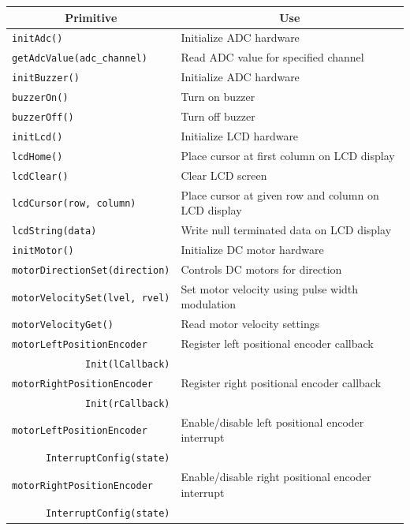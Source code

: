 \documentclass[a4paper, 12pt]{article}
\begin{document}
\begin{table}
 \centering
 \begin{tabular}{|l|l|}
 \hline
 \multicolumn{1}{|c|}{\textbf{Primitive}} & \multicolumn{1}{|c|}{\textbf{Use}}\\
 \hline \hline
 \texttt{initAdc()} & Initialize ADC hardware\\
 \texttt{getAdcValue(adc\_channel)} & Read ADC value for specified channel\\
 \hline
 \texttt{initBuzzer()} & Initialize ADC hardware\\
 \texttt{buzzerOn()} & Turn on buzzer\\
 \texttt{buzzerOff()} & Turn off buzzer\\
 \hline
 \texttt{initLcd()} & Initialize LCD hardware\\
 \texttt{lcdHome()} & Place cursor at first column on LCD display\\
 \texttt{lcdClear()} & Clear LCD screen\\
 \texttt{lcdCursor(row, column)} & Place cursor at given row and column on LCD display\\
 \texttt{lcdString(data)} & Write null terminated data on LCD display\\
 \hline
 \texttt{initMotor()} & Initialize DC motor hardware\\
 \texttt{motorDirectionSet(direction)} & Controls DC motors for direction\\
 \texttt{motorVelocitySet(lvel, rvel)} & Set motor velocity using pulse width modulation\\
 \texttt{motorVelocityGet()} & Read motor velocity settings\\
 \texttt{motorLeftPositionEncoder} & Register left positional encoder callback\\
 \multicolumn{1}{|r|}{\texttt{Init(lCallback)}} & \\
 \texttt{motorRightPositionEncoder} & Register right positional encoder callback\\
 \multicolumn{1}{|r|}{\texttt{Init(rCallback)}} & \\
 \texttt{motorLeftPositionEncoder} & Enable/disable left positional encoder interrupt\\
 \multicolumn{1}{|r|}{\texttt{InterruptConfig(state)}} &  \\
 \texttt{motorRightPositionEncoder} & Enable/disable right positional encoder interrupt\\
 \multicolumn{1}{|r|}{\texttt{InterruptConfig(state)}} & \\

\end{tabular}
\end{table}
\end{document}
